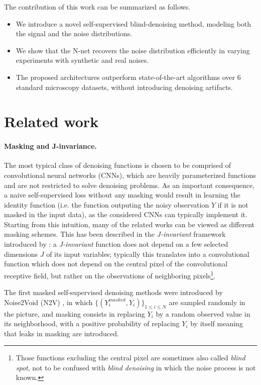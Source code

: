 \documentclass{article}
\begin{document}
The contribution of this work can be summarized as follows.
\begin{itemize}
  \item We introduce a novel self-supervised blind-denoising method, modeling both the signal and the noise distributions.
  \item We show that the N-net recovers the noise distribution efficiently in varying experiments with synthetic and real noises.
  \item The proposed architectures outperform state-of-the-art algorithms over 6 standard microscopy datasets, without introducing denoising artifacts.
\end{itemize}

\section{Related work}
\label{sec:related}
\paragraph{Masking and J-invariance.}
The most typical class of denoising functions is chosen to be comprised of convolutional neural networks (CNNs), which are heavily parameterized functions and are not restricted to solve denoising problems. As an important consequence, a naive self-supervised loss without any masking would result in learning the identity function (i.e. the function outputing the noisy observation $Y$ if it is not masked in the input data), as the considered CNNs can typically implement it. Starting from this intuition, many of the related works can be viewed as different masking schemes. This has been described in the \textit{J-invariant} framework introduced by \cite{batson2019noise2self}: a \textit{J-invariant} function does not depend on a few selected dimensions $J$ of its input variables; typically this translates into a convolutional function which does not depend on the central pixel of the convolutional receptive field, but rather on the observations of neighboring pixels\footnote{Those functions excluding the central pixel are sometimes also called \textit{blind spot}, not to be confused with \textit{blind denoising} in which the noise process is not known.}.

The first masked self-supervised denoising methods were introduced by Noise2Void (N2V) \cite{krull2018noise2void}, in which $\{(Y^{masked}_i,Y_i)\}_{1\leqslant i\leqslant N}$ are sampled randomly in the picture, and masking consists in replacing $Y_i$ by a random observed value in its neighborhood, with a positive probability of replacing $Y_i$ by itself meaning that leaks in masking are introduced.
\end{document}
